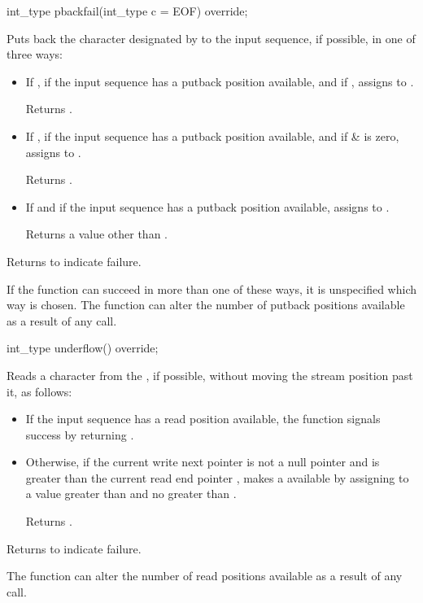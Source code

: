 %
\begin{itemdecl}
int_type pbackfail(int_type c = EOF) override;
\end{itemdecl}

\begin{itemdescr}
\pnum
Puts back the character designated by  to the input
sequence, if possible, in one of three ways:
\begin{itemize}
\item
If
,
if the input sequence has a putback position available, and if
,
assigns
to .

Returns .
\item
If
,
if the input sequence has a putback position available, and if
 \&  is zero,
assigns  to
.

Returns
.
\item
If
and if the input sequence has a putback position available,
assigns
to .

Returns a value other than
.
\end{itemize}

\pnum
Returns
to indicate failure.

\pnum
\remarks
If the function can succeed in more than one of these ways, it is
unspecified which way is chosen.
%
The function can alter the number of putback
positions available as a result of any call.
\end{itemdescr}

%
\begin{itemdecl}
int_type underflow() override;
\end{itemdecl}

\begin{itemdescr}
\pnum
\effects
Reads a character from the
,
if possible, without moving the stream position past it, as follows:
\begin{itemize}
\item
If the input sequence has a read position available, the function
signals success by returning
.
\item
Otherwise, if
the current write next pointer  is not a null pointer and
is greater than the current read end pointer ,
makes a
available by
assigning to  a value greater than  and
no greater than .

Returns .
\end{itemize}

\pnum
Returns
to indicate failure.

\pnum
\remarks
The function can alter the number of read positions available as a
result of any call.
\end{itemdescr}

